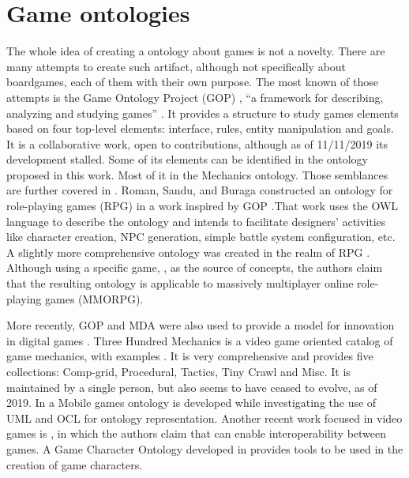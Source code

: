 \section{Game ontologies}

The whole idea of creating a ontology about games is not a novelty. There are many attempts to create such artifact, although not specifically about boardgames, each of them with their own purpose. The most known of those attempts is the Game Ontology Project (GOP) \citep{wiki:gop}, “a framework for describing, analyzing and studying games” \citep{Zagal:2008:GOP}. It  provides  a  structure  to  study  games  elements  based  on four top-level elements:  interface,  rules,  entity manipulation and goals. It  is  a  collaborative  work,  open  to  contributions, although as of 11/11/2019 its development stalled. Some of its elements can be identified in the ontology proposed in this work. Most of it in the Mechanics ontology. Those semblances are further covered in \cite{kritz_buildingOntology}. Roman,  Sandu,  and  Buraga  constructed  an  ontology  for  role-playing games (RPG) in a work inspired by GOP \citep{roman2011owl}.That work uses the OWL language to describe the ontology and intends to facilitate designers’ activities like character creation, NPC generation, simple battle system configuration, etc. A slightly more comprehensive  ontology was created in the realm of RPG \citep{dhuric2015specific}. Although  using  a  specific  game,  \cite{manaworld}, as the source of concepts, the authors claim that the resulting ontology is applicable to massively multiplayer online role-playing games (MMORPG).

More recently, GOP and MDA were also used to provide a model for innovation in digital games \citep{innov:gop:mda}. Three Hundred Mechanics is a video game oriented catalog of game mechanics, with examples \citep{300gm}. It is very comprehensive and provides five collections: Comp-grid, Procedural, Tactics, Tiny Crawl and Misc. It is maintained by a single person, but also seems to have ceased to evolve, as of 2019. In \cite{leon_z._ontology_2010} a Mobile games ontology is developed while investigating the use of UML and OCL for ontology representation. Another recent work focused in video games is \cite{parkkila_ontology_2017}, in which the authors claim that can enable interoperability between games. A Game Character Ontology developed in \cite{sacco_game_2017} provides tools to be used in the creation of game characters.


